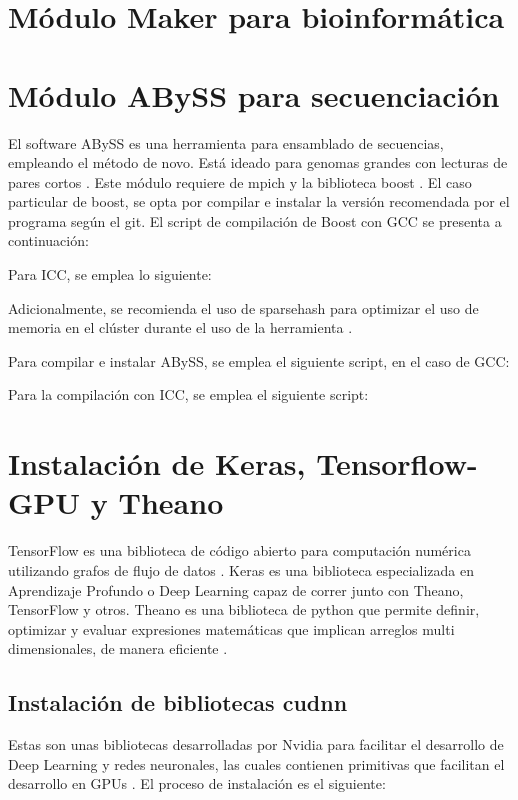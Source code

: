 

\section{Módulo Maker para bioinformática}

\section{Módulo ABySS para secuenciación}
El software ABySS es una herramienta para ensamblado de secuencias, empleando el método de novo. Está ideado para genomas grandes con lecturas de pares cortos \cite{abyss}. Este módulo requiere de mpich y la biblioteca boost \cite{boost}. El caso particular de boost, se opta por compilar e instalar la versión recomendada por el programa según el git. El script de compilación de Boost con GCC se presenta a continuación:



Para ICC, se emplea lo siguiente:



Adicionalmente, se recomienda el uso de sparsehash para optimizar el uso de memoria en el clúster durante el uso de la herramienta \cite{sparsehash}.





Para compilar e instalar ABySS, se emplea el siguiente script, en el caso de GCC:



Para la compilación con ICC, se emplea el siguiente script:


\section{Instalación de Keras, Tensorflow-GPU y Theano}
TensorFlow es una biblioteca de código abierto para computación numérica utilizando grafos de flujo de datos \cite{tensorflow}. Keras es una biblioteca especializada en Aprendizaje Profundo o Deep Learning capaz de correr junto con Theano, TensorFlow y otros. Theano es una biblioteca de python que permite definir, optimizar y evaluar expresiones matemáticas que implican arreglos multi dimensionales, de manera eficiente \cite{theano}.

\subsection{Instalación de bibliotecas cudnn}
Estas son unas bibliotecas desarrolladas por Nvidia para facilitar el desarrollo de Deep Learning y redes neuronales, las cuales contienen primitivas que facilitan el desarrollo en GPUs \cite{cudnn}. El proceso de instalación es el siguiente:

